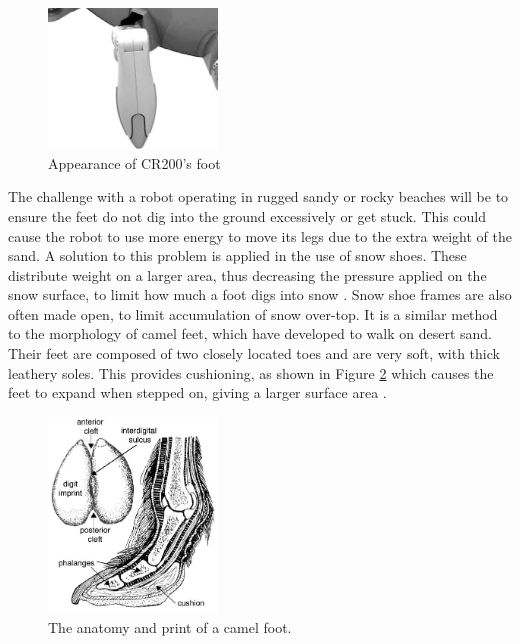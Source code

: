 \begin{figure}[h]
    \centering
    \includegraphics[width=0.4\textwidth]{Sections/LiteratureReview/img/Crabster/crabster_foot.png}
    \caption{Appearance of CR200's foot \cite{shim_development_2016}}
    \label{fig:crabster_foot_img}
\end{figure}

The challenge with a robot operating in rugged sandy or rocky beaches will be to ensure the feet do not dig into the ground excessively or get stuck. This could cause the robot to use more energy to move its legs due to the extra weight of the sand. A solution to this problem is applied in the use of snow shoes. These distribute weight on a larger area, thus decreasing the pressure applied on the snow surface, to limit how much a foot digs into snow \cite{edmonds_how_2009}. Snow shoe frames are also often made open, to limit accumulation of snow over-top. It is a similar method to the morphology of camel feet, which have developed to walk on desert sand. Their feet are composed of two closely located toes and are very soft, with thick leathery soles. This provides cushioning, as shown in Figure \ref{fig:foot_camel} which causes the feet to expand when stepped on, giving a larger surface area \cite{the_animal_facts_camel_nodate}.

\begin{figure}[H]
    \centering
    \includegraphics[width=0.4\textwidth]{Sections/LiteratureReview/img/Animals/foot_camel.JPG}
    \caption{The anatomy and print of a camel foot. \cite{lucas_ichnotaxonomy_2007}}
    \label{fig:foot_camel}
\end{figure}


